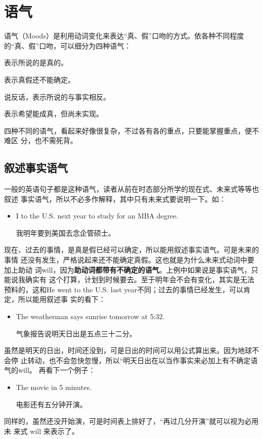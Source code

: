\chapter{语气}

语气（Moods）是利用动词变化来表达“真、假”口吻的方式。依各种不同程度的“真、假”口吻，可以细分为四种语气：
\begin{description}[style=standard, leftmargin=2em]
\item [叙述事实语气 (Indicative)] 表示所说的是真的。
\item [条件语气 (Conditional)] 表示真假还不能确定。
\item [虚拟语气 (Subjunctive)] 说反话，表示所说的与事实相反。
\item [祈使语气 (Imperative)] 表示希望能成真，但尚未实现。
\end{description}

四种不同的语气，看起来好像很复杂，不过各有各的重点，只要能掌握重点，便不难区
分，也不需死背。

\section{叙述事实语气}

一般的英语句子都是这种语气，读者从前在时态部分所学的现在式、未来式等等也叙述
事实语气，所以不必多作解释，其中只有未来式要说明一下。如：
\begin{itemize}
\item  I  to the U.S. next year to study for an MBA degree.

  我明年要到美国去念企管硕士。
\end{itemize}
现在、过去的事情，是真是假已经可以确定，所以能用叙述事实语气。可是未来的事情
还没有发生，严格说起来还不能确定真假。这也就是为什么未来式动词中要加上助动
词will，因为\textbf{助动词都带有不确定的语气}。上例中如果说是事实语气，只能说我确实有
这个打算，计划到时候要去。至于明年会不会有变化，其实是无法预料的，这和He
went to the U.S. last year不同；过去的事情已经发生，可以肯定，所以能用叙述事
实的看下：
\begin{itemize}
\item  The weatherman says sunrise tomorrow  at 5:32.

  气象报告说明天日出是五点三十二分。
\end{itemize}
虽然是明天的日出，时间还没到，可是日出的时间可以用公式算出来。因为地球不会停
止转动，也不会忽快忽慢，所以“明天日出在以当作事实来必加上有不确定语气的will。
再看下一个例子：
\begin{itemize}
\item  The movie  in 5 minutes.

  电影还有五分钟开演。
\end{itemize}
同样的，虽然还没开始演，可是时间表上排好了，“再过几分开演”就可以视为必用未
来式 will 来表示了。

